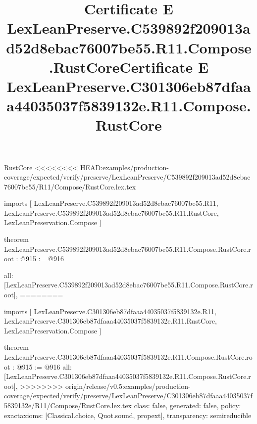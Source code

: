 \begin{lexlean}{RustCore}
<<<<<<<< HEAD:examples/production-coverage/expected/verify/preserve/LexLeanPreserve/C539892f209013ad52d8ebac76007be55/R11/Compose/RustCore.lex.tex
\title{Certificate E LexLeanPreserve.C539892f209013ad52d8ebac76007be55.R11.Compose.RustCore}
\begin{coremodule}
imports [
  LexLeanPreserve.C539892f209013ad52d8ebac76007be55.R11,
  LexLeanPreserve.C539892f209013ad52d8ebac76007be55.R11.RustCore,
  LexLeanPreservation.Compose
]

theorem LexLeanPreserve.C539892f209013ad52d8ebac76007be55.R11.Compose.RustCore.root : @915 := @916 {
  all: [LexLeanPreserve.C539892f209013ad52d8ebac76007be55.R11.Compose.RustCore.root],
========
\title{Certificate E LexLeanPreserve.C301306eb87dfaaa44035037f5839132e.R11.Compose.RustCore}
\begin{coremodule}
imports [
  LexLeanPreserve.C301306eb87dfaaa44035037f5839132e.R11,
  LexLeanPreserve.C301306eb87dfaaa44035037f5839132e.R11.RustCore,
  LexLeanPreservation.Compose
]

theorem LexLeanPreserve.C301306eb87dfaaa44035037f5839132e.R11.Compose.RustCore.root : @915 := @916 {
  all: [LexLeanPreserve.C301306eb87dfaaa44035037f5839132e.R11.Compose.RustCore.root],
>>>>>>>> origin/release/v0.5:examples/production-coverage/expected/verify/preserve/LexLeanPreserve/C301306eb87dfaaa44035037f5839132e/R11/Compose/RustCore.lex.tex
  class: false,
  generated: false,
  policy: exact{axioms: [Classical.choice, Quot.sound, propext]},
  transparency: semireducible
}


\end{coremodule}}
\end{coremodule}
\end{lexlean}
